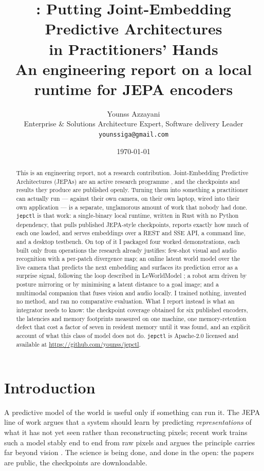 \documentclass[11pt,onecolumn]{article}
\title{\jepctl{}: Putting Joint-Embedding Predictive Architectures\\ in Practitioners' Hands\\[2mm]
\large An engineering report on a local runtime for JEPA encoders}
\author{Younss Azzayani\\
  Enterprise \& Solutions Architecture Expert, Software delivery Leader \\
  \texttt{younssiga@gmail.com}}
\date{\today}
\newcommand{\jepctl}{\texttt{jepctl}}
\begin{document}
\maketitle

\begin{abstract}
\sloppy
This is an engineering report, not a research contribution. Joint-Embedding Predictive
Architectures (JEPAs) are an active research programme
\cite{lecun2022path,ijepa2023,vjepa2_2025,lewm2026,jepaanything2026}, and the
checkpoints and results they produce are published openly. Turning them into something a
practitioner can actually run --- against their own camera, on their own laptop, wired
into their own application --- is a separate, unglamorous amount of work that nobody had
done. \jepctl{} is that work: a single-binary local runtime, written in Rust with no
Python dependency, that pulls published JEPA-style checkpoints, reports exactly how much
of each one loaded, and serves embeddings over a REST and SSE API, a command line, and a
desktop testbench. On top of it I packaged four worked demonstrations, each built only
from operations the research already justifies: few-shot visual and audio recognition
with a per-patch divergence map; an online latent world model over the live camera that
predicts the next embedding and surfaces its prediction error as a surprise signal,
following the loop described in LeWorldModel \cite{lewm2026}; a robot arm driven by
posture mirroring or by minimising a latent distance to a goal image; and a multimodal
companion that fuses vision and audio locally. I trained nothing, invented no method, and
ran no comparative evaluation. What I report instead is what an integrator needs to know:
the checkpoint coverage obtained for six published encoders, the latencies and memory
footprints measured on one machine, one memory-retention defect that cost a factor of
seven in resident memory until it was found, and an explicit account of what this class
of model does not do. \jepctl{} is Apache-2.0 licensed and available at
\url{https://github.com/younss/jepctl}.
\end{abstract}

\section{Introduction}

A predictive model of the world is useful only if something can run it. The JEPA line of
work \cite{lecun2022path,ijepa2023,vjepa2_2025} argues that a system should learn by
predicting \emph{representations} of what it has not yet seen rather than reconstructing
pixels; recent work trains such a model stably end to end from raw pixels
\cite{lewm2026} and argues the principle carries far beyond vision
\cite{jepaanything2026}. The science is being done, and done in the open: the papers are
public, the checkpoints are downloadable.
\end{document}
